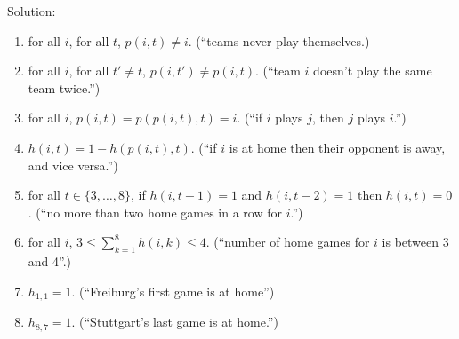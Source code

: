 \documentclass{exam}
\newcommand{\hide}[1]{}
\renewcommand{\hide}[1]{#1}
\begin{document}
\begin{questions}
\hide{
Solution:
\begin{enumerate}
  \item for all $i$, for all $t$, $p(i,t) \neq i$. (``teams never play themselves.)
  \item for all $i$, for all $t' \neq t$, $p(i,t') \neq p(i,t)$. (``team $i$ doesn't play the same team twice.'')
  \item for all $i$,  $p(i,t) = p(p(i,t),t) = i$. (``if $i$ plays $j$, then $j$ plays $i$.'')
  \item $h(i,t) = 1 - h(p(i,t),t)$.  (``if $i$ is at home then their opponent is away, and vice versa.'')
  \item for all $t \in \{3, \ldots, 8\}$, if $h(i,t-1) = 1$ and $h(i,t-2) = 1$ then $h(i,t) = 0$. (``no more than two home games in a row for $i$.'')
  \item for all $i$, $3 \leq \sum_{k=1}^8 h(i,k) \leq 4$. (``number of home games for $i$ is between 3 and 4''.)
 \item $h_{1,1} = 1$. (``Freiburg's first game is at home'')
 \item $h_{8,7} = 1$. (``Stuttgart's last game is at home.'')
\end{enumerate}
}
		
		
		

\end{questions}
\end{document}
